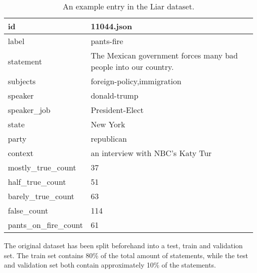 \begin{table}[]
    \centering
    \begin{tabular}{ll}
        \hline
        id                     & 11044.json                                                      \\ \hline
        label                  & pants-fire                                                      \\ \hline
        statement              & The Mexican government forces many bad people into our country. \\ \hline
        subjects               & foreign-policy,immigration                                      \\ \hline
        speaker                & donald-trump                                                    \\ \hline
        speaker\_job           & President-Elect                                                 \\ \hline
        state                  & New York                                                        \\ \hline
        party                  & republican                                                      \\ \hline
        context                & an interview with NBC's Katy Tur                                \\ \hline
        mostly\_true\_count    & 37                                                              \\ \hline
        half\_true\_count      & 51                                                              \\ \hline
        barely\_true\_count    & 63                                                              \\ \hline
        false\_count           & 114                                                             \\ \hline
        pants\_on\_fire\_count & 61                                                              \\ \hline
    \end{tabular}
    \caption{An example entry in the Liar dataset.}
\end{table}

The original dataset has been split beforehand into a test, train and validation set. 
The train set contains 80\% of the total amount of statements, while the test and validation set both contain approximately 10\% of the statements. 

